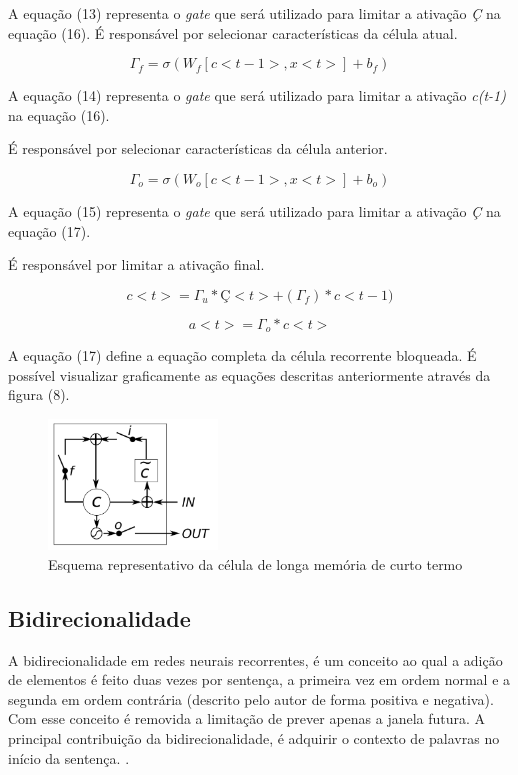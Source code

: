 \documentclass[12pt]{article}
\begin{document}
A equação (13) representa o \textit{gate} que será utilizado para limitar a ativação \textit{Ç} na equação (16). É responsável por selecionar características da célula atual.

\begin{equation}
    \Gamma_f = \sigma(W_f[c<t-1>, x<t>]+b_f)
\end{equation}

A equação (14) representa o \textit{gate} que será utilizado para limitar a ativação \textit{c(t-1)} na equação (16).

É responsável por selecionar características da célula anterior.

\begin{equation}
    \Gamma_o = \sigma(W_o[c<t-1>, x<t>]+b_o)
\end{equation}

A equação (15) representa o \textit{gate} que será utilizado para limitar a ativação \textit{Ç} na equação (17).

É responsável por limitar a ativação final.

\begin{equation}
    c<t>=\Gamma_u*Ç<t>+(\Gamma_f)*c<t-1)
\end{equation}

\begin{equation}
    a<t>=\Gamma_o*c<t>
\end{equation}

A equação (17) define a equação completa da célula recorrente bloqueada. É possível visualizar graficamente as equações descritas anteriormente através da figura (8).

\begin{figure}[!htb]
\centering
\includegraphics[width=0.4\textwidth]{images/lstm_gate.png}
\caption{Esquema representativo da célula de longa memória de curto termo \cite{DBLP:journals/corr/ChungGCB14}}
\label{fig:lstm_date}
\end{figure}

\subsection{Bidirecionalidade}
    A bidirecionalidade em redes neurais recorrentes, é um conceito ao qual a adição de elementos é feito duas vezes por sentença, a primeira vez em ordem normal e a segunda em ordem contrária (descrito pelo autor de forma positiva e negativa). Com esse conceito é removida a limitação de prever apenas a janela futura. A principal contribuição da bidirecionalidade, é adquirir o contexto de palavras no início da sentença. \cite{schuster1997bidirectional}.
\end{document}

